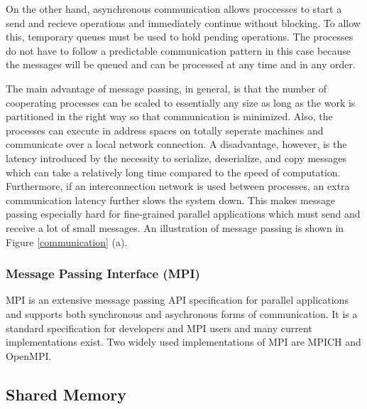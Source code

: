 \documentclass[11pt]{book}
\begin{document}
On the other hand, asynchronous communication allows proccesses to start a send and
recieve operations and immediately continue without blocking.  To allow this, temporary
queues must be used to hold pending operations.  The processes do not have to follow a
predictable communication pattern in this case because the messages will be queued and can
be processed at any time and in any order.

The main advantage of message passing, in general, is that the number of cooperating processes
can be scaled to essentially any size as long as the work is partitioned in the right way so
that communication is minimized.  Also, the processes can execute in address spaces on totally
seperate machines and communicate over a local network connection.  A disadvantage, however,
is the latency introduced by the necessity to serialize, deserialize, and copy messages which
can take a relatively long time compared to the speed of computation.  Furthermore, if an
interconnection network is used between processes, an extra communication latency further slows
the system down.  This makes message passing especially hard for fine-grained parallel applications
which must send and receive a lot of small messages.  An illustration of message passing is shown
in Figure \ref{communication} (a).

\subsubsection{Message Passing Interface (MPI)}

MPI \cite{gropp-94} is an extensive message passing API specification for parallel
applications and supports both synchronous and asychronous forms of communication.  It is
a standard specification for developers and MPI users and many current implementations
exist.  Two widely used implementations of MPI are MPICH and OpenMPI.

\subsection{Shared Memory}
\end{document}
